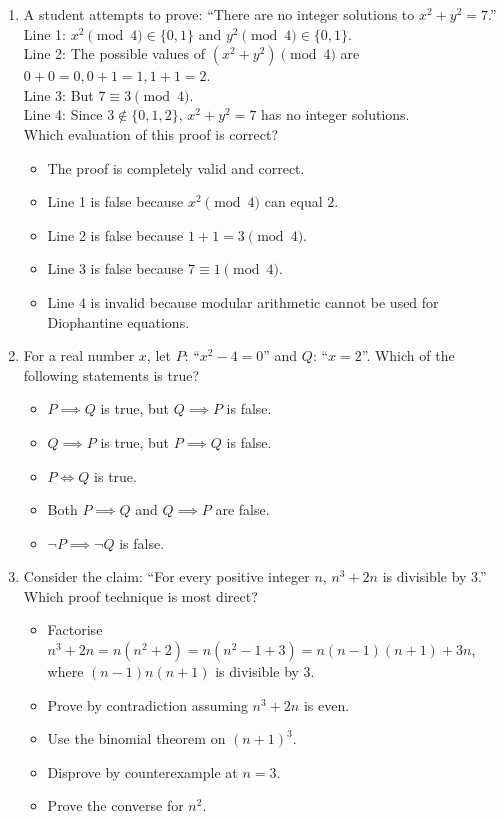 \documentclass[11pt,a4paper]{article}
\begin{document}
\begin{enumerate}
\item A student attempts to prove: ``There are no integer solutions to $x^2 + y^2 = 7$.''\\
Line 1: $x^2 \pmod 4 \in \{0,1\}$ and $y^2 \pmod 4 \in \{0,1\}$.\\
Line 2: The possible values of $(x^2 + y^2) \pmod 4$ are $0+0=0, 0+1=1, 1+1=2$.\\
Line 3: But $7 \equiv 3 \pmod 4$.\\
Line 4: Since $3 \notin \{0,1,2\}$, $x^2+y^2=7$ has no integer solutions.\\
Which evaluation of this proof is correct?
\begin{itemize}
\item[A)] The proof is completely valid and correct.
\item[B)] Line 1 is false because $x^2 \pmod 4$ can equal $2$.
\item[C)] Line 2 is false because $1+1=3 \pmod 4$.
\item[D)] Line 3 is false because $7 \equiv 1 \pmod 4$.
\item[E)] Line 4 is invalid because modular arithmetic cannot be used for Diophantine equations.
\end{itemize}

\item For a real number $x$, let $P$: ``$x^2 - 4 = 0$'' and $Q$: ``$x = 2$''. Which of the following statements is true?
\begin{itemize}
\item[A)] $P \implies Q$ is true, but $Q \implies P$ is false.
\item[B)] $Q \implies P$ is true, but $P \implies Q$ is false.
\item[C)] $P \iff Q$ is true.
\item[D)] Both $P \implies Q$ and $Q \implies P$ are false.
\item[E)] $\neg P \implies \neg Q$ is false.
\end{itemize}

\item Consider the claim: ``For every positive integer $n$, $n^3 + 2n$ is divisible by $3$.''\\
Which proof technique is most direct?
\begin{itemize}
\item[A)] Factorise $n^3+2n = n(n^2+2) = n(n^2-1+3) = n(n-1)(n+1) + 3n$, where $(n-1)n(n+1)$ is divisible by 3.
\item[B)] Prove by contradiction assuming $n^3+2n$ is even.
\item[C)] Use the binomial theorem on $(n+1)^3$.
\item[D)] Disprove by counterexample at $n=3$.
\item[E)] Prove the converse for $n^2$.
\end{itemize}


\end{enumerate}
\end{document}
